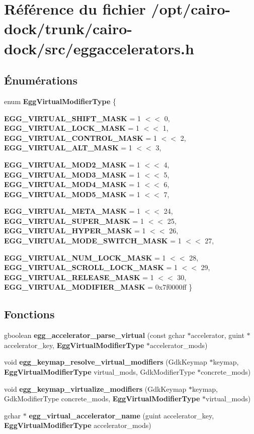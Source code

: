 \section{Référence du fichier /opt/cairo-dock/trunk/cairo-dock/src/eggaccelerators.h}
\label{eggaccelerators_8h}
\subsection*{Énumérations}
\begin{CompactItemize}
\item 
enum {\bf EggVirtualModifierType} \{ \par
{\bf EGG\_\-VIRTUAL\_\-SHIFT\_\-MASK} =  1 $<$$<$ 0, 
{\bf EGG\_\-VIRTUAL\_\-LOCK\_\-MASK} =  1 $<$$<$ 1, 
{\bf EGG\_\-VIRTUAL\_\-CONTROL\_\-MASK} =  1 $<$$<$ 2, 
{\bf EGG\_\-VIRTUAL\_\-ALT\_\-MASK} =  1 $<$$<$ 3, 
\par
{\bf EGG\_\-VIRTUAL\_\-MOD2\_\-MASK} =  1 $<$$<$ 4, 
{\bf EGG\_\-VIRTUAL\_\-MOD3\_\-MASK} =  1 $<$$<$ 5, 
{\bf EGG\_\-VIRTUAL\_\-MOD4\_\-MASK} =  1 $<$$<$ 6, 
{\bf EGG\_\-VIRTUAL\_\-MOD5\_\-MASK} =  1 $<$$<$ 7, 
\par
{\bf EGG\_\-VIRTUAL\_\-META\_\-MASK} =  1 $<$$<$ 24, 
{\bf EGG\_\-VIRTUAL\_\-SUPER\_\-MASK} =  1 $<$$<$ 25, 
{\bf EGG\_\-VIRTUAL\_\-HYPER\_\-MASK} =  1 $<$$<$ 26, 
{\bf EGG\_\-VIRTUAL\_\-MODE\_\-SWITCH\_\-MASK} =  1 $<$$<$ 27, 
\par
{\bf EGG\_\-VIRTUAL\_\-NUM\_\-LOCK\_\-MASK} =  1 $<$$<$ 28, 
{\bf EGG\_\-VIRTUAL\_\-SCROLL\_\-LOCK\_\-MASK} =  1 $<$$<$ 29, 
{\bf EGG\_\-VIRTUAL\_\-RELEASE\_\-MASK} =  1 $<$$<$ 30, 
{\bf EGG\_\-VIRTUAL\_\-MODIFIER\_\-MASK} =  0x7f0000ff
 \}
\end{CompactItemize}
\subsection*{Fonctions}
\begin{CompactItemize}
\item 
gboolean {\bf egg\_\-accelerator\_\-parse\_\-virtual} (const gchar $\ast$accelerator, guint $\ast$accelerator\_\-key, {\bf EggVirtualModifierType} $\ast$accelerator\_\-mods)
\item 
void {\bf egg\_\-keymap\_\-resolve\_\-virtual\_\-modifiers} (GdkKeymap $\ast$keymap, {\bf EggVirtualModifierType} virtual\_\-mods, GdkModifierType $\ast$concrete\_\-mods)
\item 
void {\bf egg\_\-keymap\_\-virtualize\_\-modifiers} (GdkKeymap $\ast$keymap, GdkModifierType concrete\_\-mods, {\bf EggVirtualModifierType} $\ast$virtual\_\-mods)
\item 
gchar $\ast$ {\bf egg\_\-virtual\_\-accelerator\_\-name} (guint accelerator\_\-key, {\bf EggVirtualModifierType} accelerator\_\-mods)
\end{CompactItemize}


